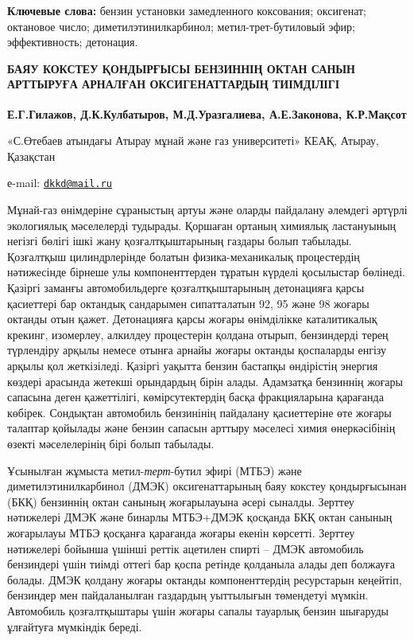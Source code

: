 {\bfseries Ключевые слова:} бензин установки замедленного коксования;
оксигенат; октановое число; диметилэтинилкарбинол; метил-трет-бутиловый
эфир; эффективность; детонация.

{\bfseries БАЯУ КОКСТЕУ ҚОНДЫРҒЫСЫ БЕНЗИННІҢ ОКТАН САНЫН АРТТЫРУҒА АРНАЛҒАН
ОКСИГЕНАТТАРДЫҢ ТИІМДІЛІГІ}

{\bfseries Е.Г.Гилажов, Д.К.Кулбатыров\textsuperscript{\envelope }, М.Д.Уразгалиева,
А.Е.Законова, К.Р.Мақсот}

«С.Өтебаев атындағы Атырау мұнай және газ университеті» КЕАҚ, Атырау,
Қазақстан

е-mail: \href{mailto:dkkd@mail.ru}{\nolinkurl{dkkd@mail.ru}}

Мұнай-газ өнімдеріне сұраныстың артуы және оларды пайдалану әлемдегі
әртүрлі экологиялық мәселелерді тудырады. Қоршаған ортаның химиялық
ластануының негізгі бөлігі ішкі жану қозғалтқыштарының газдары болып
табылады. Қозғалтқыш цилиндрлерінде болатын физика-механикалық
процестердің нәтижесінде бірнеше улы компоненттерден тұратын күрделі
қосылыстар бөлінеді. Қазіргі заманғы автомобильдерге қозғалтқыштарының
детонацияға қарсы қасиеттері бар октандық сандарымен сипатталатын 92, 95
және 98 жоғары октанды отын қажет. Детонацияға қарсы жоғары өнімділікке
каталитикалық крекинг, изомерлеу, алкилдеу процестерін қолдана отырып,
бензиндерді терең түрлендіру арқылы немесе отынға арнайы жоғары октанды
қоспаларды енгізу арқылы қол жеткізіледі. Қазіргі уақытта бензин
бастапқы өндірістің энергия көздері арасында жетекші орындардың бірін
алады. Адамзатқа бензиннің жоғары сапасына деген қажеттілігі,
көмірсутектердің басқа фракцияларына қарағанда көбірек. Сондықтан
автомобиль бензинінің пайдалану қасиеттеріне өте жоғары талаптар
қойылады және бензин сапасын арттыру мәселесі химия өнеркәсібінің өзекті
мәселелерінің бірі болып табылады.

Ұсынылған жұмыста метил-\emph{терт}-бутил эфирі (МТБЭ) және
диметилэтинилкарбинол (ДМЭК) оксигенаттарының баяу кокстеу қондырғысынан
(БКҚ) бензиннің октан санының жоғарылауына әсері сыналды. Зерттеу
нәтижелері ДМЭК және бинарлы МТБЭ+ДМЭК қосқанда БКҚ октан санының
жоғарылауы МТБЭ қосқанға қарағанда жоғары екенін көрсетті. Зерттеу
нәтижелері бойынша үшінші реттік ацетилен спирті -- ДМЭК автомобиль
бензиндері үшін тиімді оттегі бар қоспа ретінде қолданыла алады деп
болжауға болады. ДМЭК қолдану жоғары октанды компоненттердің ресурстарын
кеңейтіп, бензиндер мен пайдаланылған газдардың уыттылығын төмендетуі
мүмкін. Автомобиль қозғалтқыштары үшін жоғары сапалы тауарлық бензин
шығаруды ұлғайтуға мүмкіндік береді.


